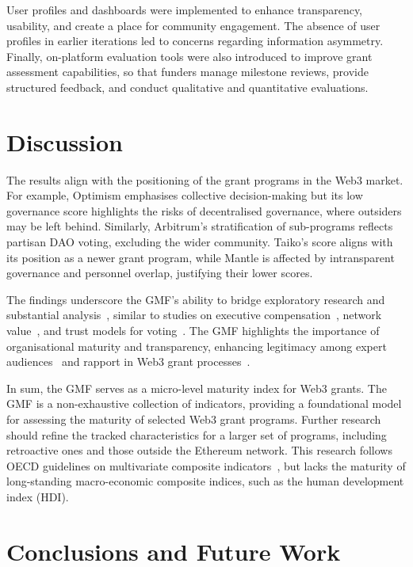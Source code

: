 \documentclass[conference]{IEEEtran}
\begin{document}
User profiles and dashboards were implemented to enhance transparency, usability, and create a place for community engagement. The absence of user profiles in earlier iterations led to concerns regarding information asymmetry. Finally, on-platform evaluation tools were also introduced to improve grant assessment capabilities, so that funders manage milestone reviews, provide structured feedback, and conduct qualitative and quantitative evaluations.

\section{Discussion}\label{sec_5}

The results align with the positioning of the grant programs in the Web3 market. For example, Optimism emphasises collective decision-making but its low governance score highlights the risks of decentralised governance, where outsiders may be left behind. Similarly, Arbitrum’s stratification of sub-programs reflects partisan DAO voting, excluding the wider community. Taiko’s score aligns with its position as a newer grant program, while Mantle is affected by intransparent governance and personnel overlap, justifying their lower scores.

The findings underscore the GMF’s ability to bridge exploratory research and substantial analysis~\cite{mukumbang_retroductive_2023}, similar to studies on executive compensation~\cite{billett_stockholder_2010}, network value~\cite{papaioannou_business_2023}, and trust models for voting~\cite{baranski_trust-centric_2024,lin_voting_2023}. The GMF highlights the importance of organisational maturity and transparency, enhancing legitimacy among expert audiences~\cite[p.~116]{curtin_does_2006} and rapport in Web3 grant processes~\cite{suddaby_legitimacy_2017}.

In sum, the GMF serves as a micro-level maturity index for Web3 grants. The GMF is a non-exhaustive collection of indicators, providing a foundational model for assessing the maturity of selected Web3 grant programs. Further research should refine the tracked characteristics for a larger set of programs, including retroactive ones and those outside the Ethereum network. This research follows OECD guidelines on multivariate composite indicators~\cite{oecd_handbook_2008}, but lacks the maturity of long-standing macro-economic composite indices, such as the human development index (HDI).

\section{Conclusions and Future Work}\label{sec_6}
\end{document}
